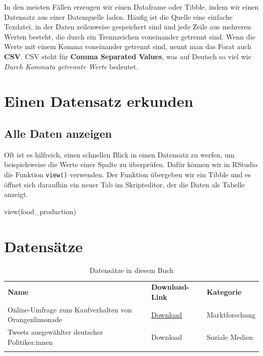 \documentclass[
]{book}
\newenvironment{Shaded}{\begin{snugshade}}{\end{snugshade}}
\newcommand{\FunctionTok}[1]{\textcolor[rgb]{0.00,0.00,0.00}{#1}}
\newcommand{\NormalTok}[1]{#1}
\begin{document}
In den meisten Fällen erzeugen wir einen Dataframe oder Tibble, indem wir einen Datensatz aus einer Datenquelle laden. Häufig ist die Quelle eine einfache Texdatei, in der Daten zeilenweise gespeichert sind und jede Zeile aus mehreren Werten besteht, die durch ein Trennzeichen voneinander getrennt sind. Wenn die Werte mit einem Komma voneinander getrennt sind, nennt man das Forat auch \textbf{CSV}. CSV steht für \textbf{Comma Separated Values}, was auf Deutsch so viel wie \emph{Durch Kommata getrennte Werte} bedeutet.

\hypertarget{einen-datensatz-erkunden}{%
\chapter{Einen Datensatz erkunden}\label{einen-datensatz-erkunden}}

\hypertarget{alle-daten-anzeigen}{%
\section{Alle Daten anzeigen}\label{alle-daten-anzeigen}}

Oft ist es hilfreich, einen schnellen Blick in einen Datensatz zu werfen, um beispielsweise die Werte einer Spalte zu überprüfen. Dafür können wir in RStudio die Funktion \texttt{view()} verwenden. Der Funktion übergeben wir ein Tibble und es öffnet sich daraufhin ein neuer Tab im Skripteditor, der die Daten als Tabelle anzeigt.

\begin{Shaded}
\begin{Highlighting}[]
\FunctionTok{view}\NormalTok{(food\_production)}
\end{Highlighting}
\end{Shaded}

\hypertarget{datensaetze}{%
\chapter{Datensätze}\label{datensaetze}}

\begin{longtable}[]{@{}
  >{\raggedright\arraybackslash}p{}
  >{\raggedright\arraybackslash}p{}
  >{\raggedright\arraybackslash}p{}@{}}
\caption{Datensätze in diesem Buch}\tabularnewline
\toprule
\endhead
\textbf{Name} & \textbf{Download-Link} & \textbf{Kategorie} \\
Online-Umfrage zum Kaufverhalten von Orangenlimonade & \href{datasets/limonade.csv}{Download} & Marktforschung \\
Tweets ausgewählter deutscher Politiker:innen & Download & Soziale Medien \\
& & \\
\bottomrule
\end{longtable}

  
\end{document}
